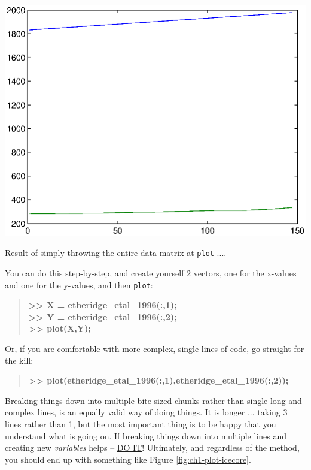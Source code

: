\documentclass{tufte-book} %
\newenvironment{docspec}{\begin{quotation}\ttfamily\parskip0pt\parindent0pt\ignorespaces}{\end{quotation}}
\begin{document}
\begin{marginfigure}[0.0in]
\includegraphics[width=\linewidth]{ch1-plot-icecore_default.eps}
\caption{Result of simply throwing the entire data matrix at \texttt{plot} ....}
\label{fig:ch1-plot-icecore_default}
\end{marginfigure}

You can do this step-by-step, and create yourself 2 vectors, one for the x-values and one for the y-values, and then \texttt{plot}:

\begin{docspec}
\textbf{>> X = etheridge\_etal\_1996(:,1);\\
>> Y = etheridge\_etal\_1996(:,2);\\
>> plot(X,Y);}
\end{docspec}

Or, if you are comfortable with more complex, single lines of code, go straight for the kill:

\begin{docspec}
\textbf{>> plot(etheridge\_etal\_1996(:,1),etheridge\_etal\_1996(:,2));}
\end{docspec}

Breaking things down into multiple bite-sized chunks rather than single long and complex lines,  is an equally valid way of doing things. It is longer ... taking 3 lines rather than 1, but the most important thing is to be happy that you understand what is going on. If breaking things down into multiple lines and creating new \textit{variables} helps -- \uline{DO IT}! Ultimately, and regardless of the method, you should end up with something like Figure \ref{fig:ch1-plot-icecore}.
\end{document}
